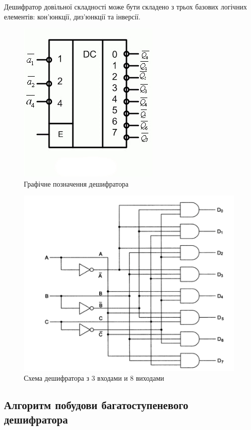 Дешифратор довільної складності може бути складено з трьох базових логічних елементів: кон'юнкції, диз'юнкції та інверсії.
\begin{figure}[h!]
 \includegraphics{decoder.jpg}
 \centering
\caption{Графічне позначення дешифратора}\label{fig:decoder}
\end{figure}
\begin{figure}[h!]
 \includegraphics[scale=0.5]{decoder_scheme.png}
 \centering
\caption{Схема дешифратора з 3 входами и 8 виходами}\label{fig:decoder_scheme}
\end{figure}
\newpage
\subsection{Алгоритм побудови багатоступеневого дешифратора}

\newpage
